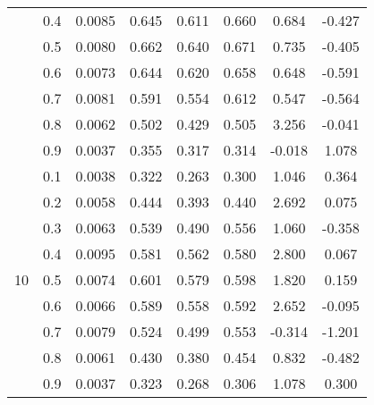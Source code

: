 \documentclass[11pt,a4paper]{report}
\begin{document}
\begin{longtable}{ | c | c || c | c | c | c | c | c | }
 & 0.4 & 0.0085 & 0.645 & 0.611 & 0.660 & 0.684 & -0.427 \\
 & 0.5 & 0.0080 & 0.662 & 0.640 & 0.671 & 0.735 & -0.405 \\
 & 0.6 & 0.0073 & 0.644 & 0.620 & 0.658 & 0.648 & -0.591 \\
 & 0.7 & 0.0081 & 0.591 & 0.554 & 0.612 & 0.547 & -0.564 \\
 & 0.8 & 0.0062 & 0.502 & 0.429 & 0.505 & 3.256 & -0.041 \\
 & 0.9 & 0.0037 & 0.355 & 0.317 & 0.314 & -0.018 & 1.078 \\
 \hline
\multirow{9}{*}{10} & 0.1 & 0.0038 & 0.322 & 0.263 & 0.300 & 1.046 & 0.364 \\
 & 0.2 & 0.0058 & 0.444 & 0.393 & 0.440 & 2.692 & 0.075 \\
 & 0.3 & 0.0063 & 0.539 & 0.490 & 0.556 & 1.060 & -0.358 \\
 & 0.4 & 0.0095 & 0.581 & 0.562 & 0.580 & 2.800 & 0.067 \\
 & 0.5 & 0.0074 & 0.601 & 0.579 & 0.598 & 1.820 & 0.159 \\
 & 0.6 & 0.0066 & 0.589 & 0.558 & 0.592 & 2.652 & -0.095 \\
 & 0.7 & 0.0079 & 0.524 & 0.499 & 0.553 & -0.314 & -1.201 \\
 & 0.8 & 0.0061 & 0.430 & 0.380 & 0.454 & 0.832 & -0.482 \\
 & 0.9 & 0.0037 & 0.323 & 0.268 & 0.306 & 1.078 & 0.300 \\
 \hline
\hline
\end{longtable}
\end{document}
